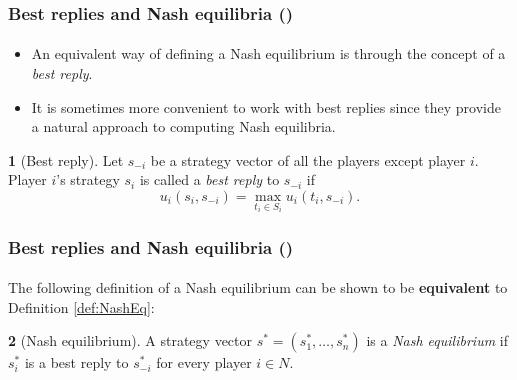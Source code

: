 \documentclass[10pt]{beamer}
\theoremstyle{definition}
\newtheorem{definition}{\translate{Definition}}
\begin{document}
\setcounter{slidenum}{1}
\begin{frame}[fragile]
\frametitle{Best replies and Nash equilibria ()}
\framesubtitle{}
\begin{itemize}\itemsep1em
\item An equivalent way of defining a Nash equilibrium is through the concept of a \emph{best reply}.
\item It is sometimes more convenient to work with best replies since they provide a natural approach to computing Nash equilibria.
\end{itemize}

\begin{definition}[Best reply]\label{def:BR}
Let $ s_{-i} $ be a strategy vector of all the players except player $ i $. Player $ i $'s strategy $ s_i $ is called a \emph{best reply} to $ s_{-i} $ if \begin{equation}
u_i(s_i,s_{-i}) = \max_{t_i \in S_i}u_i(t_i,s_{-i}).
\label{eq:BR}
\end{equation}
\end{definition}
\end{frame}



\begin{frame}[fragile]
\frametitle{Best replies and Nash equilibria ()}
\framesubtitle{}
The following definition of a Nash equilibrium can be shown to be \textbf{equivalent} to Definition \ref{def:NashEq}:\bigskip

\begin{definition}[Nash equilibrium]\label{def:NashEq2}
A strategy vector $ s^* = (s_1^*,\ldots,s_n^*) $ is a \emph{Nash equilibrium} if $ s_i^* $ is a best reply to $ s_{-i}^* $ for every player $ i \in N $.
\end{definition}
\end{frame}
\end{document}
